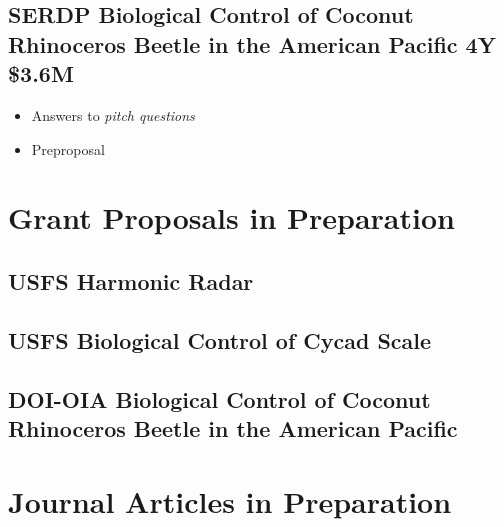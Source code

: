 \subsection{SERDP Biological Control of Coconut Rhinoceros Beetle in the American Pacific 4Y \$3.6M}
\label{SERDP}
\begin{refsection}
	\begin{itemize}
		\item Answers to \textit{pitch questions} \cite{moore_aubreymoore/answers--pitch-questions_2019} 
		\item Preproposal \cite{moore_serdp_2020}	
	\end{itemize}
	\printbibliography[heading=none]
\end{refsection}

\section{Grant Proposals in Preparation}

\subsection{USFS Harmonic Radar}
\label{harmonic radio}

\subsection{USFS Biological Control of Cycad Scale}
\label{cycad scale}

\subsection{DOI-OIA Biological Control of Coconut Rhinoceros Beetle in the American Pacific}
\label{doi2}

\pagebreak
\section{Journal Articles in Preparation}
\begin{refsection}
\cite{moore_first_nodate-1} \cite{moore_mariana_2013}
\printbibliography[heading=none]
\end{refsection}



\begin{comment}

\clearpage
\nocite{*}
\printbibliography
\end{comment}


